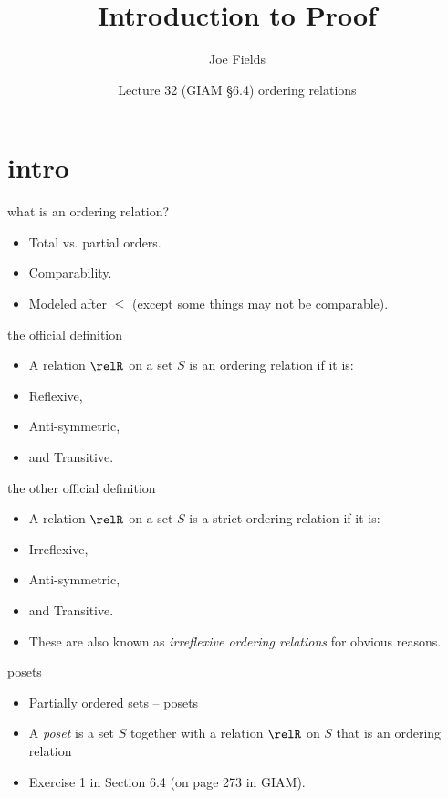 \documentclass[handout,landscape]{beamer}
\author{Joe Fields}
\title{Introduction to Proof}
\date{Lecture 32 (GIAM \S 6.4) \newline ordering relations}
\institute[SCSU]{ {\tt fieldsj1@southernct.edu} }
\begin{document}
\begin{frame}[plain]
  \titlepage
\end{frame}

\section{intro}

\begin{frame}{what is an ordering relation?}
\begin{itemize}
\item Total vs. partial orders.\pause
\item Comparability.\pause
\item Modeled after $\leq$ (except some things may not be comparable).
\end{itemize}
\end{frame}

\begin{frame}{the official definition}
\begin{itemize}
\item A relation $\relR$ on a set $S$ is an ordering relation if it is:\pause
\item Reflexive,\pause
\item Anti-symmetric,\pause
\item and Transitive.
\end{itemize}
\end{frame}

\begin{frame}{the other official definition}
\begin{itemize}
\item A relation $\relR$ on a set $S$ is a strict ordering relation if it is:\pause
\item Irreflexive,\pause
\item Anti-symmetric,\pause
\item and Transitive. \pause
\item These are also known as {\em irreflexive ordering relations} for obvious reasons.
\end{itemize}
\end{frame}

\begin{frame}{posets}
\begin{itemize}
\item Partially ordered sets -- posets \pause
\item A {\em poset} is a set $S$ together with a relation $\relR$ on $S$ that is an ordering relation\pause
\item Exercise 1 in Section 6.4 (on page 273 in GIAM).
\end{itemize}
\end{frame}
\end{document}
